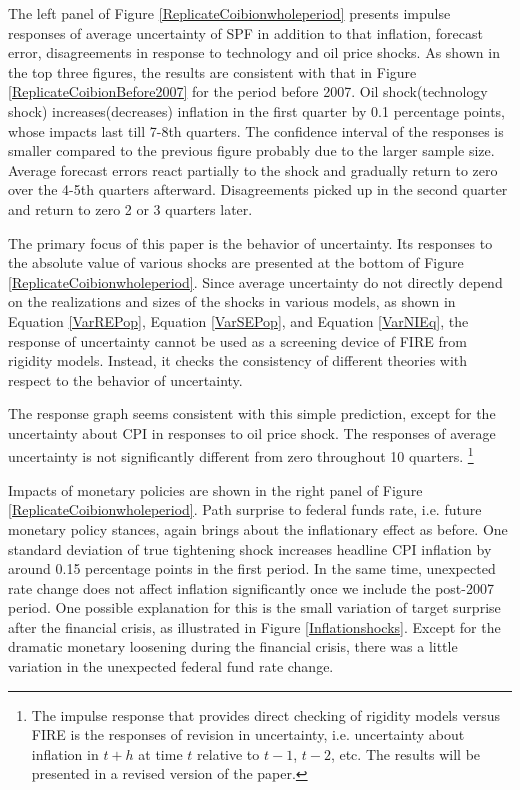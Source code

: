 \documentclass[12pt]{article}
\begin{document}
	The left panel of  Figure \ref{ReplicateCoibionwholeperiod} presents impulse responses of average uncertainty of SPF in addition to that inflation, forecast error, disagreements in response to technology and oil price shocks. As shown in the top three figures, the results are consistent with that in Figure \ref{ReplicateCoibionBefore2007} for the period before 2007.  Oil shock(technology shock) increases(decreases) inflation in the first quarter by 0.1 percentage points, whose impacts last till 7-8th quarters. The confidence interval of the responses is smaller compared to the previous figure probably due to the larger sample size.  Average forecast errors react partially to the shock and gradually return to zero over the 4-5th quarters afterward. Disagreements picked up in the second quarter and return to zero 2 or 3 quarters later. 
	
	
	The primary focus of this paper is the behavior of uncertainty. Its responses to the absolute value of various shocks are presented at the bottom of Figure \ref{ReplicateCoibionwholeperiod}. Since average uncertainty do not directly depend on the realizations and sizes of the shocks in various models, as shown in Equation \ref{VarREPop},  Equation \ref{VarSEPop}, and Equation \ref{VarNIEq}, the response of uncertainty cannot be used as a screening device of  FIRE from rigidity models. Instead, it checks the consistency of different theories with respect to the behavior of uncertainty.  
	
	The response graph seems consistent with this simple prediction, except for the uncertainty about CPI in responses to oil price shock. The responses of average uncertainty is not significantly different from zero throughout 10 quarters. \footnote{The impulse response that provides direct checking of rigidity models versus FIRE is the responses of revision in uncertainty, i.e. uncertainty about inflation in $t+h$ at time $t$ relative to $t-1$, $t-2$, etc. The results will be presented in a revised version of the paper.} 
	
	Impacts of monetary policies are shown in the right panel of Figure \ref{ReplicateCoibionwholeperiod}. Path surprise to federal funds rate, i.e. future monetary policy stances, again brings about the inflationary effect as before. One standard deviation of true tightening shock increases headline CPI inflation by around 0.15 percentage points in the first period.  In the same time, unexpected rate change does not affect inflation significantly once we include the post-2007 period.  One possible explanation for this is the small variation of target surprise after the financial crisis, as illustrated in Figure \ref{Inflationshocks}. Except for the dramatic monetary loosening during the financial crisis, there was a little variation in the unexpected federal fund rate change.  
	
\end{document}
